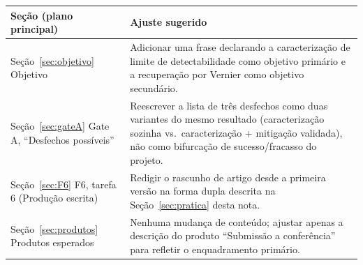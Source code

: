 \documentclass[11pt,a4paper]{article}
\begin{document}
\begin{center}
\begin{tabularx}{\textwidth}{@{}L{3.6cm} X@{}}
\toprule
\textbf{Seção (plano principal)} & \textbf{Ajuste sugerido} \\
\midrule
Seção~\ref{sec:objetivo} Objetivo &
Adicionar uma frase declarando a caracterização de limite de detectabilidade como
objetivo primário e a recuperação por Vernier como objetivo secundário. \\
Seção~\ref{sec:gateA} Gate A, ``Desfechos possíveis'' &
Reescrever a lista de três desfechos como duas variantes do mesmo resultado
(caracterização sozinha vs.\ caracterização + mitigação validada), não como
bifurcação de sucesso/fracasso do projeto. \\
Seção~\ref{sec:F6} F6, tarefa 6 (Produção escrita) &
Redigir o rascunho de artigo desde a primeira versão na forma dupla descrita na
Seção~\ref{sec:pratica} desta nota. \\
Seção~\ref{sec:produtos} Produtos esperados &
Nenhuma mudança de conteúdo; ajustar apenas a descrição do produto ``Submissão a
conferência'' para refletir o enquadramento primário. \\
\bottomrule
\end{tabularx}
\end{center}
\end{document}
